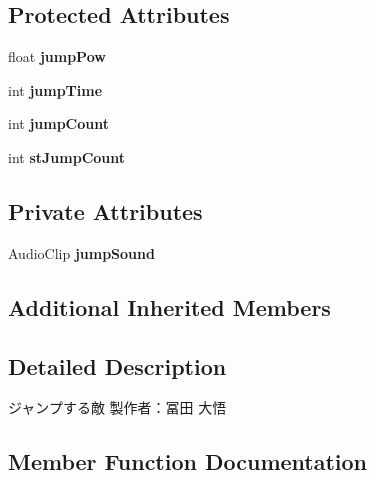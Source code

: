 \subsection*{Protected Attributes}
\begin{DoxyCompactItemize}
\item 
\mbox{\label{class_jump_enemy_ad87d48943e6666bf0d9c07c8e3d51002}} 
float {\bfseries jump\+Pow}
\item 
\mbox{\label{class_jump_enemy_ab035e81aa1ab55ff34e4ba3682ed4c51}} 
int {\bfseries jump\+Time}
\item 
\mbox{\label{class_jump_enemy_afce99e515da2dcc9b392c92a0b30e1d1}} 
int {\bfseries jump\+Count}
\item 
\mbox{\label{class_jump_enemy_af7acfa1250bb13fa7f13a24f7549d944}} 
int {\bfseries st\+Jump\+Count}
\end{DoxyCompactItemize}
\subsection*{Private Attributes}
\begin{DoxyCompactItemize}
\item 
\mbox{\label{class_jump_enemy_a4ceb75b013c26c0ab00e5d1421ef1c21}} 
Audio\+Clip {\bfseries jump\+Sound}
\end{DoxyCompactItemize}
\subsection*{Additional Inherited Members}


\subsection{Detailed Description}
ジャンプする敵 製作者：冨田 大悟 



\subsection{Member Function Documentation}
\mbox{\label{class_jump_enemy_ab5eb8680db77e9ed5ab5696b41aa7b29}} 
